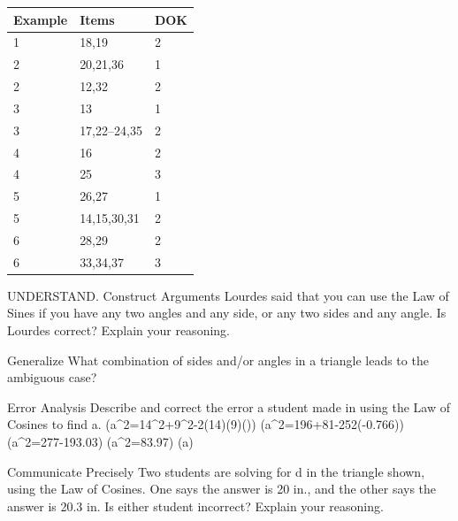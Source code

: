 \documentclass{article}
\newenvironment{item-analysis}{}{}      %
\newenvironment{practice}[2]{}{}        %
\newcommand{\answer}[1]{}               %
\newcommand{\placeholder}[2]{}          %
\begin{document}
\begin{item-analysis}
\begin{tabular}{lll}
\toprule
Example & Items & DOK \\
\midrule
1 & 18,19 & 2 \\
2 & 20,21,36 & 1 \\
2 & 12,32 & 2 \\
3 & 13 & 1 \\
3 & 17,22--24,35 & 2 \\
4 & 16 & 2 \\
4 & 25 & 3 \\
5 & 26,27 & 1 \\
5 & 14,15,30,31 & 2 \\
6 & 28,29 & 2 \\
6 & 33,34,37 & 3 \\
\bottomrule
\end{tabular}
\end{item-analysis}
\begin{practice}{12}{2}
UNDERSTAND. Construct Arguments Lourdes said that you can use the Law of Sines if you have any two angles and any side, or any two sides and any angle. Is Lourdes correct? Explain your reasoning.
\answer{No, Lourdes is not correct. To use the Law of Sines, you need a corresponding side and angle, plus one other side or angle. If you have sides a and b, and angle C, for example, it would not work.}
\end{practice}
\begin{practice}{13}{1}
Generalize What combination of sides and/or angles in a triangle leads to the ambiguous case?
\answer{Angle-Side-Side}
\end{practice}
\begin{practice}{14}{2}
Error Analysis Describe and correct the error a student made in using the Law of Cosines to find a.
(a^2=14^2+9^2-2(14)(9)())
(a^2=196+81-252(-0.766))
(a^2=277-193.03)
(a^2=83.97)
(a)
\placeholder{illustration}{Pale gray student work note with curled lower right corner and red X, containing the five incorrect calculation lines transcribed above.}
\answer{Since cos 140° is negative, the student should have added 193.03 to 277 to get (a^2=470.03). Then (a=21.68).}
\end{practice}
\begin{practice}{15}{2}
Communicate Precisely Two students are solving for d in the triangle shown, using the Law of Cosines. One says the answer is 20 in., and the other says the answer is 20.3 in. Is either student incorrect? Explain your reasoning.
\placeholder{diagram}{Black triangle with left angle red 46°, upper vertex, lower right vertex; side from left to upper 17 in., left to lower right 28 in., upper to lower right d.}
\answer{Neither student is incorrect; they reported their answers to different degrees of precision. Since the given values are in integers, 20 in. is probably precise enough.}
\end{practice}
\end{document}
